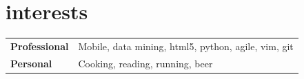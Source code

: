 \documentclass[]{friggeri-cv} %
\begin{document}


%


\section{interests}


\begin{tabular}{p{3cm}p{10.8cm}}
\textbf{Professional} &  Mobile, data mining, html5, python, agile, vim, git
\vspace{\parsep}
\\
\textbf{Personal} & Cooking, reading, running, beer
\vspace{\parsep}
\\
\end{tabular}

\end{document}
